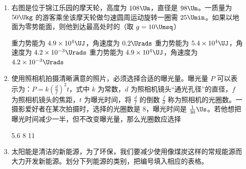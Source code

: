 \documentclass[\gkver]{gaokaozhenti}
\begin{document}
\begin{enumerate}

{弹簧的拉力减小，条形磁铁对桌面的压力减小}
{弹簧的拉力增大，条形磁铁对桌面的压力增大}
{弹簧的拉力减小，条形磁铁对桌面的压力增大}


\item
右图是位于锦江乐园的摩天轮，高度为 $108\Um$，直径是 $98\Um$。一质量为 $50\Ukg$ 的游客乘坐该摩天轮做匀速圆周运动旋转一圈需 $25\Umin$。如果以地面为零势能面，则他到达最高处时的（取 $g=10\Umsq$）


{重力势能为 $4.9\times10^{4}\UJ$，角速度为 $0.2\Urads$}
{重力势能为 $5.4\times10^{4}\UJ$，角速度为 $4.2\times10^{-3}\Urads$}
{重力势能为 $4.9\times10^{4}\UJ$，角速度为 $4.2\times10^{-3}\Urads$}


\item
使用照相机拍摄清晰满意的照片，必须选择合适的曝光量。曝光量 $P$ 可以表示为：$P=k\left(\frac{d}{f}\right)^{2}t$，式中 $k$ 为常数，$d$ 为照相机镜头“通光孔径”的直径，$f$ 为照相机镜头的焦距，$t$ 为曝光时间，将 $\frac{d}{f}$ 的倒数 $\frac{f}{d}$ 称为照相机的光圈数。一摄影爱好者在某次拍摄时，选择的光圈数是 8，曝光时间是 $\frac{1}{30}\Us$。若他想把曝光时间减少一半，但不改变曝光量，那么光圈数应选择

{5.6}
{8}
{11}


\item
太阳能是清洁的新能源，为了环保，我们要减少使用像煤炭这样的常规能源而大力开发新能源。划分下列能源的类别，把编号填入相应的表格。


\end{enumerate}
\end{document}
